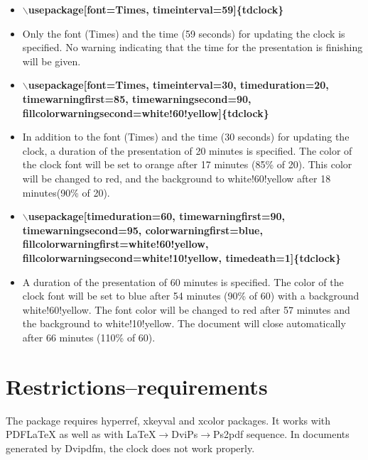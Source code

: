 \documentclass{article}
\begin{document}
\begin{itemize}
\item
{\bf $\backslash$usepackage[font=Times, timeinterval=59]\{tdclock\} }

\item[] Only the font (Times) and the time (59 seconds) for updating the clock is specified.  No warning indicating
that the time for the presentation is finishing will be given.

\item
{\bf $\backslash$usepackage[font=Times, timeinterval=30, timeduration=20, \\
timewarningfirst=85, timewarningsecond=90, \\
fillcolorwarningsecond=white!60!yellow]\{tdclock\} }

\item[] In addition to the font (Times) and the time (30 seconds) for updating the clock, a duration of the presentation of 20 minutes is specified.  The color of the clock font will be set to orange after 17 minutes (85\% of 20).  This color will be changed to red,
    and the background to white!60!yellow after 18 minutes(90\% of 20).

\item
{\bf $\backslash$usepackage[timeduration=60, timewarningfirst=90, \\
timewarningsecond=95, colorwarningfirst=blue, \\
fillcolorwarningfirst=white!60!yellow, \\
fillcolorwarningsecond=white!10!yellow, timedeath=1]\{tdclock\} }

\item[] A duration of the presentation of 60 minutes is specified.  The color of the clock font will be set to blue
after 54 minutes (90\% of 60) with a background white!60!yellow.  The font color will be changed to red after
57 minutes and the background to white!10!yellow.  The document will close automatically after 66 minutes
(110\% of 60).

\end{itemize}

\section{Restrictions--requirements}
The package  requires hyperref, xkeyval and xcolor packages. It works with PDF\LaTeX\/ as well as with \LaTeX\/$\to$DviPs$\to$Ps2pdf sequence.
In documents generated by Dvipdfm, the clock does not work properly.
\end{document}
